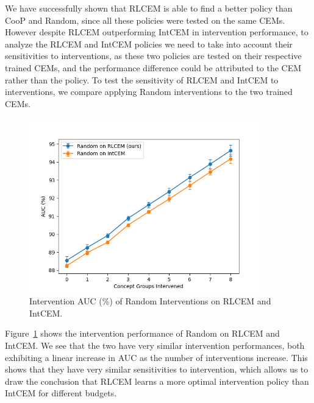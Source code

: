 We have successfully shown that RLCEM is able to find a better 
policy than CooP and Random, since all these policies were tested
on the same CEMs. However despite RLCEM outperforming 
IntCEM in intervention performance, to analyze the RLCEM and IntCEM 
policies we need to take into account their sensitivities 
to interventions, as these 
two policies are tested on their respective trained CEMs, and the performance
difference could be attributed to the CEM rather than the policy. To test 
the sensitivity of RLCEM and IntCEM to interventions, we compare 
applying Random interventions to the two trained CEMs.

\begin{figure}[!h]
    \centering
    \includegraphics[width=0.9\textwidth]{figs/evaluation/mnist_random_off.png}
    \caption{
        Intervention AUC (\%) of Random Interventions on RLCEM and IntCEM.
    }
    \label{fig:mnist-random-off}
\end{figure}

Figure~\ref{fig:mnist-random-off} shows the intervention performance of Random
on RLCEM and IntCEM. We see that the two have very similar intervention performances,
both exhibiting a linear increase in AUC as the number of interventions increase.
This shows that they have very similar sensitivities to intervention, which 
allows us to draw the conclusion that RLCEM learns a more optimal
intervention policy 
than IntCEM for different budgets.

